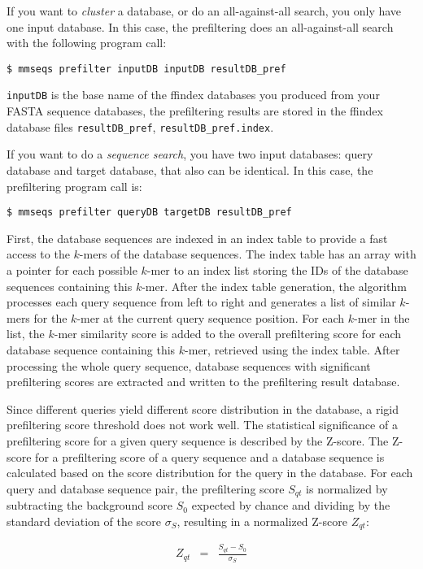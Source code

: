 \documentclass[11pt,a4paper]{report}
\begin{document}
If you want to \emph{cluster} a database, or do an all-against-all
search, you only have one input database. In this case, the prefiltering
does an all-against-all search with the following program call:

\texttt{\$ mmseqs prefilter inputDB inputDB resultDB\_pref }

\texttt{inputDB} is the base name of the ffindex databases you produced
from your FASTA sequence databases, the prefiltering results are stored
in the ffindex database files \texttt{resultDB\_pref}, \texttt{resultDB\_pref.index}.

If you want to do a \emph{sequence search}, you have two input databases:
query database and target database, that also can be identical. In
this case, the prefiltering program call is:

\texttt{\$ mmseqs prefilter queryDB targetDB resultDB\_pref }

First, the database sequences are indexed in an index table to provide
a fast access to the $k$-mers of the database sequences. The index
table has an array with a pointer for each possible $k$-mer to an
index list storing the IDs of the database sequences containing this
$k$-mer. After the index table generation, the algorithm processes
each query sequence from left to right and generates a list of similar
$k$-mers for the $k$-mer at the current query sequence position.
For each $k$-mer in the list, the $k$-mer similarity score is added
to the overall prefiltering score for each database sequence containing
this $k$-mer, retrieved using the index table. After processing the
whole query sequence, database sequences with significant prefiltering
scores are extracted and written to the prefiltering result database. 

Since different queries yield different score distribution in the
database, a rigid prefiltering score threshold does not work well.
The statistical significance of a prefiltering score for a given query
sequence is described by the Z-score. The Z-score for a prefiltering
score of a query sequence and a database sequence is calculated based
on the score distribution for the query in the database. For each
query and database sequence pair, the prefiltering score $S_{qt}$
is normalized by subtracting the background score $S_{0}$ expected
by chance and dividing by the standard deviation of the score $\sigma_{S}$,
resulting in a normalized Z-score $Z_{qt}$:

\begin{eqnarray*}
Z_{qt} & = & \frac{S_{qt}-S_{0}}{\sigma_{S}}\end{eqnarray*}
\end{document}
